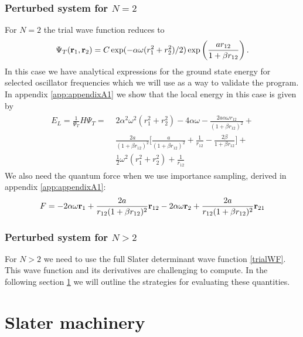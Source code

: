\documentclass[english, a4paper]{article}
\begin{document}
\subsubsection{Perturbed system for $N=2$}
For $N=2$ the trial wave function reduces to
\begin{equation}
 \Psi_T({\bf r}_1,{\bf r}_2) = C\exp(-\alpha \omega (r_1^2+r_2^2)/2)\exp\left(\frac{ar_{12}}{1+\beta r_{12}}\right).
 \label{trialWF2}
\end{equation}
In this case we have analytical expressions for the ground state energy for selected oscillator
frequencies which we will use as a way to validate the program. 
In appendix \ref{app:appendixA1} we show
that the local energy in this case is given by
\begin{align}
\begin{split}
 E_L = \frac{1}{\Psi_T}H\Psi_T = \,\,  &2\alpha^2 \omega^2(r_1^2 + r_2^2) - 4\alpha \omega
 - \frac{2a\alpha \omega r_{12}}{(1+\beta r_{12})^2} + \\
 &\frac{2a}{(1+\beta r_{12})^2}\biggr[ \frac{a}{(1+\beta r_{12})^2} + 
              \frac{1}{r_{12}} - \frac{2\beta}{1 + \beta r_{12}} \biggr] + \\
 &\frac{1}{2}\omega^2(r_1^2 + r_2^2) + \frac{1}{r_{12}}
\end{split}
\end{align}
We also need the quantum force when we use importance sampling, derived in appendix \ref{app:appendixA1}:
\begin{equation}
 F =-2\alpha\omega {\bf r}_1 + \frac{2a}{r_{12}(1 + \beta r_{12})^2} {\bf r}_{12}
 -2\alpha\omega {\bf r}_2 + \frac{2a}{r_{12}(1 + \beta r_{12})^2} {\bf r}_{21}
\end{equation}

\subsubsection{Perturbed system for $N>2$}
For $N > 2$ we need to use the full Slater determinant wave function \eqref{trialWF}. This wave function 
and its derivatives are challenging to compute. In the following section \ref{sec:slater} we will
outline the strategies for evaluating these quantities.

\section{Slater machinery}
\label{sec:slater}
\end{document}
